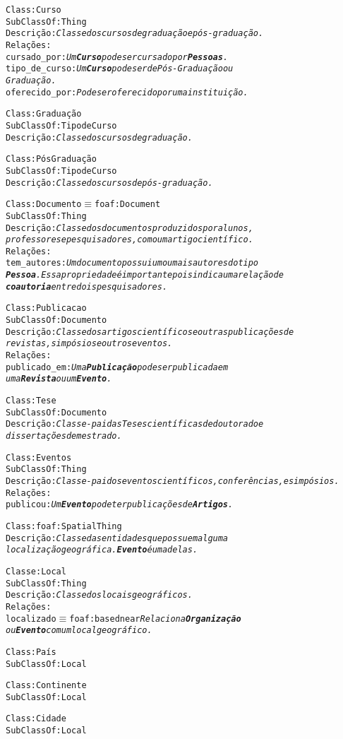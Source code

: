 \begin{alltt}
Class: Curso
SubClassOf: Thing
Descrição: \emph{Classe dos cursos de graduação e pós-graduação.}
Relações:
  cursado_por: \emph{Um \textbf{Curso} pode ser cursado por \textbf{Pessoas}.}
  tipo_de_curso: \emph{Um \textbf{Curso} pode ser de Pós-Graduação ou
  Graduação.}
  oferecido_por: \emph{Pode ser oferecido por uma instituição.}

Class: Graduação
SubClassOf: Tipo de Curso
Descrição: \emph{Classe dos cursos de graduação.}

Class: Pós Graduação
SubClassOf: Tipo de Curso
Descrição: \emph{Classe dos cursos de pós-graduação.}

Class: Documento \( \equiv \) foaf:Document
SubClassOf: Thing
Descrição: \emph{Classe dos documentos produzidos por alunos,
professores e pesquisadores, como um artigo científico.}
Relações:
  tem_autores: \emph{Um documento possui um ou mais autores do tipo
  \textbf{Pessoa}. Essa propriedade é importante pois indica uma relação de
  \textbf{coautoria} entre dois pesquisadores.}

Class: Publicacao
SubClassOf: Documento
Descrição: \emph{Classe dos artigos científicos e outras publicações de
revistas, simpósios e outros eventos.}
Relações:
  publicado_em: \emph{Uma \textbf{Publicação} pode ser publicada em
  uma \textbf{Revista} ou um \textbf{Evento}.}

Class: Tese
SubClassOf: Documento
Descrição: \emph{Classe-pai das Teses científicas de doutorado e
dissertações de mestrado.}

Class: Eventos
SubClassOf: Thing
Descrição: \emph{Classe-pai dos eventos científicos, conferências, e simpósios.}
Relações:
  publicou: \emph{Um \textbf{Evento} pode ter publicações de \textbf{Artigos}.}

Class: foaf:Spatial Thing
Descrição: \emph{Classe das entidades que possuem alguma
localização geográfica. \textbf{Evento} é uma delas.}

Classe: Local
SubClassOf: Thing
Descrição: \emph{Classe dos locais geográficos.}
Relações:
  localizado \( \equiv \) foaf:based near \emph{Relaciona \textbf{Organização}
  ou \textbf{Evento} com um local geográfico.}

Class: País
SubClassOf: Local

Class: Continente
SubClassOf: Local

Class: Cidade
SubClassOf: Local

\end{alltt}

